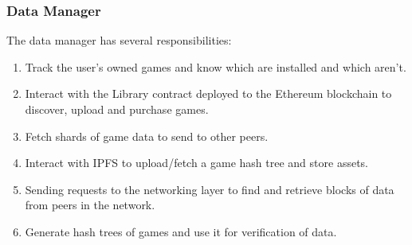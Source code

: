 \subsubsection{Data Manager}

The data manager has several responsibilities:

\begin{enumerate}
  \item Track the user's owned games and know which are installed and which aren't.
  \item Interact with the Library contract deployed to the Ethereum blockchain to discover, upload and purchase games.
  \item Fetch shards of game data to send to other peers.
  \item Interact with IPFS to upload/fetch a game hash tree and store assets.
  \item Sending requests to the networking layer to find and retrieve blocks of data from peers in the network.
  \item Generate hash trees of games and use it for verification of data.
\end{enumerate}